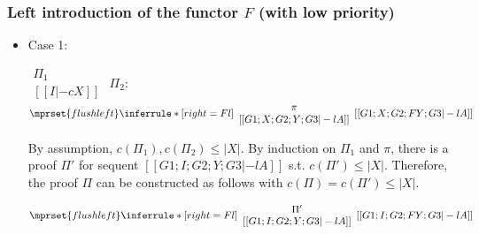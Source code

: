 \subsubsection{Left introduction of the functor $F$ (with low priority)}
\begin{itemize}
\item Case 1:
      \begin{center}
        \scriptsize
        \begin{math}
          \begin{array}{c}
            \Pi_1 \\
            {[[I |-c X]]}
          \end{array}
        \end{math}
        \qquad\qquad
        $\Pi_2$:
        \begin{math}
          $$\mprset{flushleft}
          \inferrule* [right={\tiny Fl}] {
            {
              \begin{array}{c}
                \pi \\
                {[[G1; X; G2; Y; G3 |-l A]]}
              \end{array}
            }
          }{[[G1; X; G2; F Y; G3 |-l A]]}
        \end{math}
      \end{center}
      By assumption, $c(\Pi_1),c(\Pi_2)\leq |X|$. By induction on $\Pi_1$
      and $\pi$, there is a proof $\Pi'$ for sequent
      $[[G1; I; G2; Y; G3 |-l A]]$ s.t. $c(\Pi') \leq |X|$. Therefore, the
      proof $\Pi$ can be constructed as follows with
      $c(\Pi) = c(\Pi') \leq |X|$.
      \begin{center}
        \scriptsize
        \begin{math}
          $$\mprset{flushleft}
          \inferrule* [right={\tiny Fl}] {
            {
              \begin{array}{c}
                \Pi' \\
                {[[G1; I; G2; Y; G3 |-l A]]}
              \end{array}
            }
          }{[[G1; I; G2; F Y; G3 |-l A]]}
        \end{math}
      \end{center}


\end{itemize}
